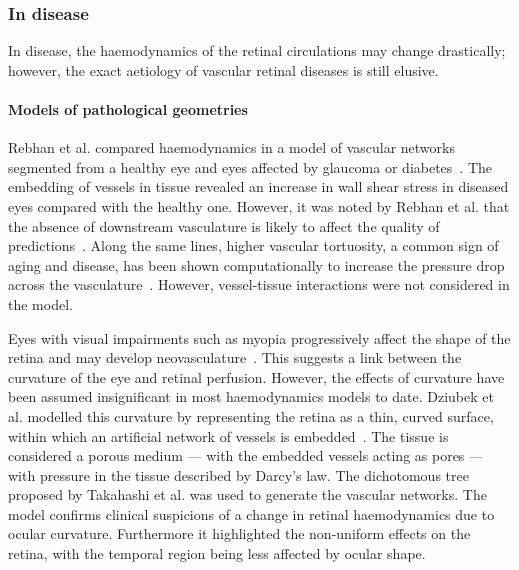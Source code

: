 \documentclass{article}
\begin{document}
\subsubsection{In disease}

In disease, the haemodynamics of the retinal circulations may change drastically; however, the exact aetiology of vascular retinal diseases is still elusive.

\paragraph*{Models of pathological geometries} 

Rebhan et al. compared haemodynamics in a model of vascular networks segmented from a healthy eye and eyes affected by glaucoma or diabetes~\cite{Rebhan_2019}.
The embedding of vessels in tissue revealed an increase in wall shear stress in diseased eyes compared with the healthy one.
However, it was noted by Rebhan et al. that the absence of downstream vasculature is likely to affect the quality of predictions~\cite{Rebhan_2019}.
Along the same lines, higher vascular tortuosity, a common sign of aging and disease, has been shown computationally to increase the pressure drop across the vasculature~\cite{Malek_2014}.
However, vessel-tissue interactions were not considered in the model.

Eyes with visual impairments such as myopia progressively affect the shape of the retina and may develop neovasculature~\cite{Medina_2016}.
This suggests a link between the curvature of the eye and retinal perfusion.
However, the effects of curvature have been assumed insignificant in most haemodynamics models to date.
Dziubek et al. modelled this curvature by representing the retina as a thin, curved surface, within which an artificial network of vessels is embedded~\cite{Dziubek_2015}.
The tissue is considered a porous medium --- with the embedded vessels acting as pores --- with pressure in the tissue described by Darcy's law.
The dichotomous tree proposed by Takahashi et al. was used to generate the vascular networks.
The model confirms clinical suspicions of a change in retinal haemodynamics due to ocular curvature.
Furthermore it highlighted the non-uniform effects on the retina, with the temporal region being less affected by ocular shape\cite{Dziubek_2015}.
\end{document}
